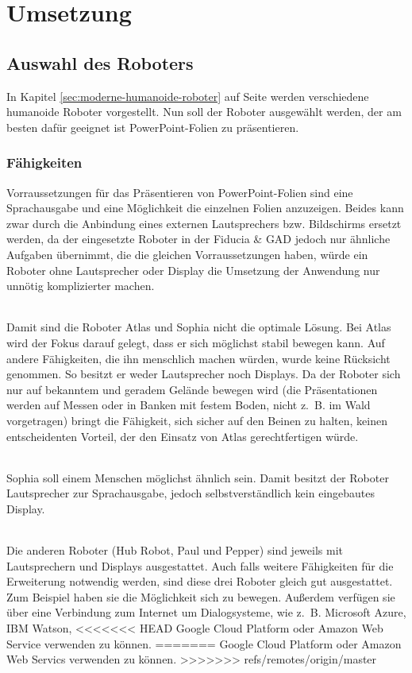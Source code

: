 \chapter{Umsetzung}\label{sec:umsetzung}
\section{Auswahl des Roboters}
In Kapitel \ref{sec:moderne-humanoide-roboter} auf Seite
\pageref{sec:moderne-humanoide-roboter} werden verschiedene humanoide Roboter
vorgestellt. Nun soll der Roboter ausgewählt werden, der am besten dafür
geeignet ist PowerPoint-Folien zu präsentieren.

\subsection{Fähigkeiten}
Vorraussetzungen für das Präsentieren von PowerPoint-Folien sind eine
Sprachausgabe und eine Möglichkeit die einzelnen Folien anzuzeigen. Beides kann
zwar durch die Anbindung eines externen Lautsprechers bzw. Bildschirms ersetzt
werden, da der eingesetzte Roboter in der Fiducia \& GAD jedoch nur ähnliche
Aufgaben übernimmt, die die gleichen Vorraussetzungen haben, würde ein Roboter
ohne Lautsprecher oder Display die Umsetzung der Anwendung nur unnötig
komplizierter machen.

\subparagraph{}
Damit sind die Roboter Atlas und Sophia nicht die optimale Lösung. Bei Atlas
wird der Fokus darauf gelegt, dass er sich möglichst stabil bewegen kann. Auf
andere Fähigkeiten, die ihn menschlich machen würden, wurde keine Rücksicht
genommen.
So besitzt er weder Lautsprecher noch Displays. Da der Roboter sich nur auf
bekanntem und geradem Gelände bewegen wird (die Präsentationen werden auf
Messen oder in Banken mit festem Boden, nicht z.~B. im Wald vorgetragen) bringt
die Fähigkeit, sich sicher auf den Beinen zu halten, keinen entscheidenten
Vorteil, der den Einsatz von Atlas gerechtfertigen würde.

\subparagraph{}
Sophia soll einem Menschen möglichst ähnlich sein. Damit besitzt der Roboter
Lautsprecher zur Sprachausgabe, jedoch selbstverständlich kein eingebautes
Display.

\subparagraph{}
Die anderen Roboter (Hub Robot, Paul und Pepper) sind jeweils mit Lautsprechern
und Displays ausgestattet. Auch falls weitere Fähigkeiten für die Erweiterung
notwendig werden, sind diese drei Roboter gleich gut ausgestattet. Zum Beispiel
haben sie die Möglichkeit sich zu bewegen. Außerdem verfügen sie über eine
Verbindung zum Internet um Dialogsysteme, wie z.~B. Microsoft Azure, IBM Watson,
<<<<<<< HEAD
Google Cloud Platform oder Amazon Web Service verwenden zu können.
=======
Google Cloud Platform oder Amazon Web Servics verwenden zu können.
>>>>>>> refs/remotes/origin/master

